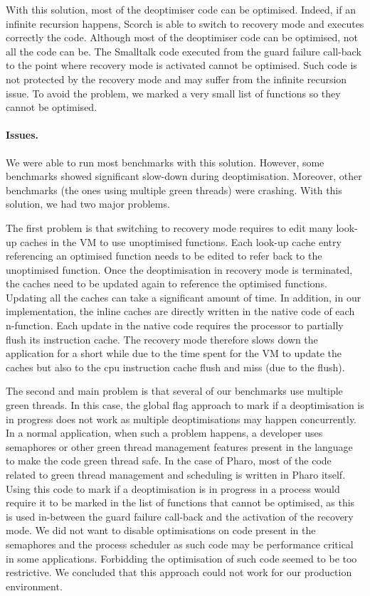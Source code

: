 \documentclass[a4paper,12pt,twoside]{../includes/ThesisStyle}
\begin{document}
With this solution, most of the deoptimiser code can be optimised. Indeed, if an infinite recursion happens, Scorch is able to switch to recovery mode and executes correctly the code. Although most of the deoptimiser code can be optimised, not all the code can be. The Smalltalk code executed from the guard failure call-back to the point where recovery mode is activated cannot be optimised. Such code is not protected by the recovery mode and may suffer from the infinite recursion issue. To avoid the problem, we marked a very small list of functions so they cannot be optimised.

\paragraph{Issues.} We were able to run most benchmarks with this solution. However, some benchmarks showed significant slow-down during deoptimisation. Moreover, other benchmarks (the ones using multiple green threads) were crashing. With this solution, we had two major problems. 

The first problem is that switching to recovery mode requires to edit many look-up caches in the VM to use unoptimised functions. Each look-up cache entry referencing an optimised function needs to be edited to refer back to the unoptimised function. Once the deoptimisation in recovery mode is terminated, the caches need to be updated again to reference the optimised functions. Updating all the caches can take a significant amount of time. In addition, in our implementation, the inline caches are directly written in the native code of each n-function. Each update in the native code requires the processor to partially flush its instruction cache. The recovery mode therefore slows down the application for a short while due to the time spent for the VM to update the caches but also to the cpu instruction cache flush and miss (due to the flush).

The second and main problem is that several of our benchmarks use multiple green threads. In this case, the global flag approach to mark if a deoptimisation is in progress does not work as multiple deoptimisations may happen concurrently. In a normal application, when such a problem happens, a developer uses semaphores or other green thread management features present in the language to make the code green thread safe. In the case of Pharo, most of the code related to green thread management and scheduling is written in Pharo itself. Using this code to mark if a deoptimisation is in progress in a process would require it to be marked in the list of functions that cannot be optimised, as this is used in-between the guard failure call-back and the activation of the recovery mode. We did not want to disable optimisations on code present in the semaphores and the process scheduler as such code may be performance critical in some applications. Forbidding the optimisation of such code seemed to be too restrictive. We concluded that this approach could not work for our production environment.
\end{document}
